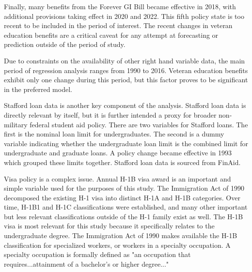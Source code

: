 \documentclass[review]{elsarticle}
\begin{document}
Finally, many benefits from the Forever GI Bill became effective in 2018,
with additional provisions taking effect in 2020 and 2022\cite{veteransaffairs_2020}.
This fifth policy state is too recent to be included in the period of interest.
The recent changes in veteran education benefits are a critical caveat for any attempt at forecasting or prediction outside of the period of study.

Due to constraints on the availability of other right hand variable data,
the main period of regression analysis ranges from 1990 to 2016.
Veteran education benefits exhibit only one change during this period,
but this factor proves to be significant in the preferred model.
%

Stafford loan data is another key component of the analysis.
Stafford loan data is directly relevant by itself,
but it is further intended a proxy for broader non-military federal student aid policy.
There are two variables for Stafford loans.
The first is the nominal loan limit for undergraduates.
The second is a dummy variable indicating whether the undergraduate loan limit
is the combined limit for undergraduate and graduate loans.
A policy change became effective in 1993 which grouped these limits together.
Stafford loan data is sourced from FinAid\cite{finaid_2020}.

Visa policy is a complex issue.
Annual H-1B visa award is an important and simple variable used for the purposes of this study.
The Immigration Act of 1990 decomposed the existing H-1 visa into distinct H-1A and H-1B categories.
Over time, H-1B1 and H-1C classifications were established,
and many other important but less relevant classifications outside of the H-1 family exist as well.
The H-1B visa is most relevant for this study because it specifically relates to the undergraduate degree.
The Immigration Act of 1990 makes available the H-1B classification for specialized workers,
or workers in a specialty occupation.
A specialty occupation is formally defined as "an occupation that requires...attainment of a bachelor's or higher degree..."
\end{document}
